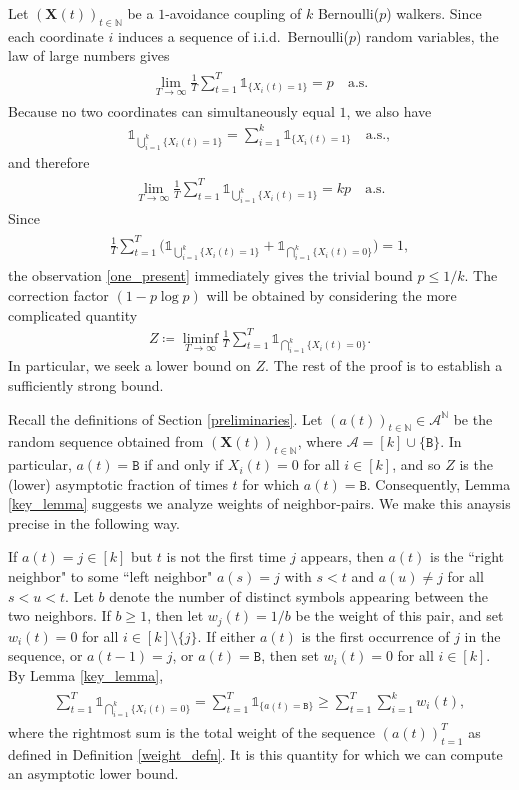 \documentclass[11pt,reqno]{amsart} %
\newcommand{\one}{\mathds{1}}
\numberwithin{equation}{section}
\newcommand{\eq}[1]{\begin{align*} #1 \end{align*}}
\newcommand{\eeq}[1]{\begin{align} \begin{split} #1 \end{split} \end{align}}
\newcommand{\N}{\mathbb{N}}
\renewcommand{\a}{\mathcal{A}}
\theoremstyle{definition}
\newcommand{\vc}[1]{{\mathbf #1}}
\begin{document}
Let $(\vc X(t))_{t\in\N}$ be a $1$-avoidance coupling of $k$ Bernoulli($p$) walkers.
Since each coordinate $i$ induces a sequence of i.i.d.~Bernoulli($p$) random variables, the law of large numbers gives
\eeq{ \label{LLN_1}
\lim_{T\to\infty}\frac{1}{T}\sum_{t=1}^{T} \one_{\{X_i(t) = 1\}} = p \quad \mathrm{a.s.}
}
Because no two coordinates can simultaneously equal $1$, we also have
\eq{
\one_{\bigcup_{i=1}^k \{X_i(t) = 1\}} = \sum_{i=1}^k \one_{\{X_i(t) = 1\}} \quad \mathrm{a.s.},
}
and therefore
\eeq{ \label{one_present}
\lim_{T\to\infty}\frac{1}{T}\sum_{t = 1}^{T} \one_{\bigcup_{i=1}^k \{X_i(t) = 1\}}
 = kp \quad \mathrm{a.s.}
}
Since
\eeq{ \label{either_case}
\frac{1}{T}\sum_{t=1}^{T}  \big(\one_{\bigcup_{i=1}^k \{X_i(t) = 1\}} + \one_{\bigcap_{i=1}^k \{X_i(t)=0\}}\big) = 1,
}
the observation \eqref{one_present} immediately gives the trivial bound $p \leq 1/k$.
The correction factor $(1-p\log p)$ will be obtained by considering the more complicated quantity
\eq{
Z \coloneqq \liminf_{T\to\infty} \frac{1}{T}\sum_{t=1}^{T}  \one_{\bigcap_{i=1}^k \{X_i(t)=0\}}.
}
In particular, we seek a lower bound on $Z$.
The rest of the proof is to establish a sufficiently strong bound.

Recall the definitions of Section \ref{preliminaries}.
Let $(a(t))_{t\in\N} \in \a^\N$ be the random sequence obtained from $(\vc X(t))_{t\in\N}$, where $\a = [k] \cup \{\texttt{B}\}$.
In particular, $a(t) = \texttt{B}$ if and only if $X_i(t) = 0$ for all $i \in [k]$,
and so $Z$ is the (lower) asymptotic fraction of times $t$ for which $a(t) = \texttt{B}$.
Consequently, Lemma \ref{key_lemma} suggests we analyze weights of neighbor-pairs.
We make this anaysis precise in the following way.

If $a(t) = j \in [k]$ but $t$ is not the first time $j$ appears, then $a(t)$ is the ``right neighbor" to some ``left neighbor" $a(s) = j$ with $s < t$ and $a(u) \neq j$ for all $s < u < t$.
Let $b$ denote the number of distinct symbols appearing between the two neighbors.
If $b \geq 1$, then let $w_j(t) = 1/b$ be the weight of this pair, and set $w_i(t) = 0$ for all $i \in [k] \setminus \{j\}$.
If either $a(t)$ is the first occurrence of $j$ in the sequence, or $a(t-1) = j$, or $a(t) = \texttt{B}$, then set $w_i(t) = 0$ for all $i\in[k]$.
By Lemma \ref{key_lemma},
\eeq{ \label{weight_ineq}
\sum_{t = 1}^T  \one_{\bigcap_{i=1}^k \{X_i(t)=0\}} = \sum_{t = 1}^T  \one_{\{a(t) = \texttt{B}\}} \geq \sum_{t=1}^T \sum_{i = 1}^k w_i(t),
}
where the rightmost sum is the total weight of the sequence $(a(t))_{t=1}^T$ as defined in Definition \ref{weight_defn}.
It is this quantity for which we can compute an asymptotic lower bound.
\end{document}
